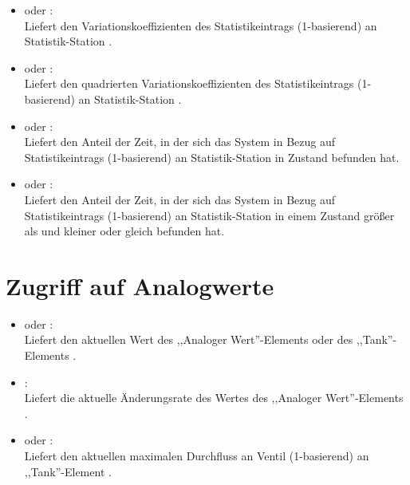 \begin{itemize}
\item
{} oder :\\
Liefert den Variationskoeffizienten des Statistikeintrags  (1-basierend) an Statistik-Station .

\item
{} oder :\\
Liefert den quadrierten Variationskoeffizienten des Statistikeintrags  (1-basierend) an Statistik-Station .

\item
{} oder :\\
Liefert den Anteil der Zeit, in der sich das System in Bezug auf Statistikeintrags  (1-basierend) an Statistik-Station  in Zustand  befunden hat.

\item
{} oder :\\
Liefert den Anteil der Zeit, in der sich das System in Bezug auf Statistikeintrags  (1-basierend) an Statistik-Station  in einem Zustand größer als  und kleiner oder gleich  befunden hat.

\end{itemize}


\section{Zugriff auf Analogwerte}
  
\begin{itemize}

\item
{} oder :\\
Liefert den aktuellen Wert des ,,Analoger Wert''-Elements oder des ,,Tank''-Elements .

\item
{}:\\
Liefert die aktuelle Änderungsrate des Wertes des ,,Analoger Wert''-Elements .

\item
{} oder :\\
Liefert den aktuellen maximalen Durchfluss an Ventil  (1-basierend) an ,,Tank''-Element .

\end{itemize}



